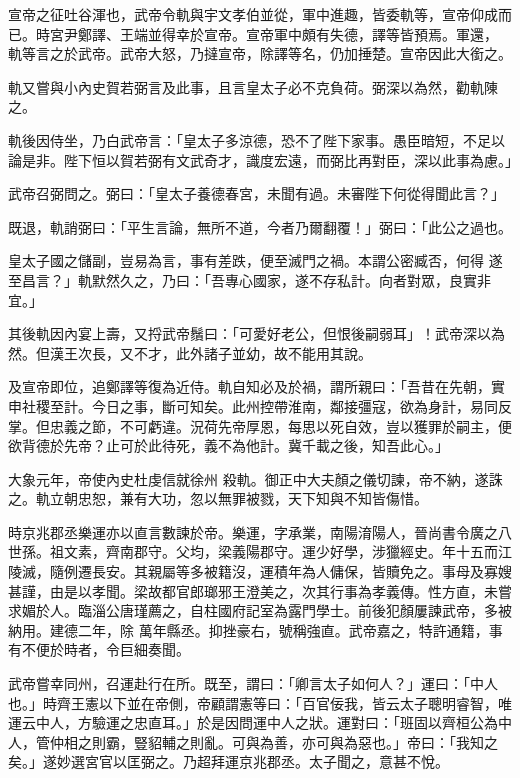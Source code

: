 \begin{pinyinscope}
 宣帝之征吐谷渾也，武帝令軌與宇文孝伯並從，軍中進趣，皆委軌等，宣帝仰成而已。時宮尹鄭譯、王端並得幸於宣帝。宣帝軍中頗有失德，譯等皆預焉。軍還，
 軌等言之於武帝。武帝大怒，乃撻宣帝，除譯等名，仍加捶楚。宣帝因此大銜之。



 軌又嘗與小內史賀若弼言及此事，且言皇太子必不克負荷。弼深以為然，勸軌陳之。



 軌後因侍坐，乃白武帝言：「皇太子多涼德，恐不了陛下家事。愚臣暗短，不足以論是非。陛下恒以賀若弼有文武奇才，識度宏遠，而弼比再對臣，深以此事為慮。」



 武帝召弼問之。弼曰：「皇太子養德春宮，未聞有過。未審陛下何從得聞此言？」



 既退，軌誚弼曰：「平生言論，無所不道，今者乃爾翻覆！」弼曰：「此公之過也。



 皇太子國之儲副，豈易為言，事有差跌，便至滅門之禍。本謂公密臧否，何得
 遂至昌言？」軌默然久之，乃曰：「吾專心國家，遂不存私計。向者對眾，良實非宜。」



 其後軌因內宴上壽，又捋武帝鬚曰：「可愛好老公，但恨後嗣弱耳」！武帝深以為然。但漢王次長，又不才，此外諸子並幼，故不能用其說。



 及宣帝即位，追鄭譯等復為近侍。軌自知必及於禍，謂所親曰：「吾昔在先朝，實申社稷至計。今日之事，斷可知矣。此州控帶淮南，鄰接彊寇，欲為身計，易同反掌。但忠義之節，不可虧違。況荷先帝厚恩，每思以死自效，豈以獲罪於嗣主，便欲背德於先帝？止可於此待死，義不為他計。冀千載之後，知吾此心。」



 大象元年，帝使內史杜虔信就徐州
 殺軌。御正中大夫顏之儀切諫，帝不納，遂誅之。軌立朝忠恕，兼有大功，忽以無罪被戮，天下知與不知皆傷惜。



 時京兆郡丞樂運亦以直言數諫於帝。樂運，字承業，南陽淯陽人，晉尚書令廣之八世孫。祖文素，齊南郡守。父均，梁義陽郡守。運少好學，涉獵經史。年十五而江陵滅，隨例遷長安。其親屬等多被籍沒，運積年為人傭保，皆贖免之。事母及寡嫂甚謹，由是以孝聞。梁故都官郎瑯邪王澄美之，次其行事為孝義傳。性方直，未嘗求媚於人。臨淄公唐瑾薦之，自柱國府記室為露門學士。前後犯顏屢諫武帝，多被納用。建德二年，除
 萬年縣丞。抑挫豪右，號稱強直。武帝嘉之，特許通籍，事有不便於時者，令巨細奏聞。



 武帝嘗幸同州，召運赴行在所。既至，謂曰：「卿言太子如何人？」運曰：「中人也。」時齊王憲以下並在帝側，帝顧謂憲等曰：「百官佞我，皆云太子聰明睿智，唯運云中人，方驗運之忠直耳。」於是因問運中人之狀。運對曰：「班固以齊桓公為中人，管仲相之則霸，豎貂輔之則亂。可與為善，亦可與為惡也。」帝曰：「我知之矣。」遂妙選宮官以匡弼之。乃超拜運京兆郡丞。太子聞之，意甚不悅。




\end{pinyinscope}
